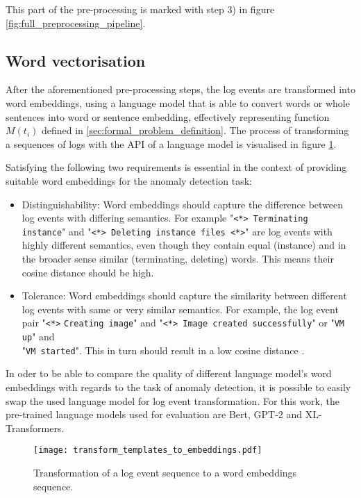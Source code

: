 This part of the pre-processing is marked with step 3) in figure \ref{fig:full_preprocessing_pipeline}.

\subsection{Word vectorisation \label{sec:word_vectorization}}
After the aforementioned pre-processing steps, the log events are transformed into word embeddings, using a language model that is able to convert words or whole sentences into word or sentence embedding, effectively representing function $M(t_i)$ defined in \ref{sec:formal_problem_definition}. The process of transforming a sequences of logs with the API of a language model is visualised in figure \ref{fig:transform_sequence_to_embeddings}.

Satisfying the following two requirements is essential in the context of providing suitable word embeddings for the anomaly detection task:
\begin{itemize}
	\item Distinguishability: Word embeddings should capture the difference between log events with differing semantics. For example "\verb!<*> Terminating instance!" and "\verb!<*> Deleting instance files <*>!" are log events with highly different semantics, even though they contain equal (instance) and in the broader sense similar (terminating, deleting) words. This means their cosine distance should be high.
	\item Tolerance: Word embeddings should capture the similarity between different log events with same or very similar semantics. For example, the log event pair "\verb!<*>! \verb!Creating image!" and "\verb!<*> Image created successfully!" or "\verb!VM up!" and \\ "\verb!VM started!". This in turn should result in a low cosine distance \cite{zhang2019robust}.
\end{itemize}

In oder to be able to compare the quality of different language model's word embeddings with regards to the task of anomaly detection, it is possible to easily swap the used language model for log event transformation. For this work, the pre-trained language models used for evaluation are Bert, GPT-2 and XL-Transformers. 


\begin{figure}[H]
	\centering
	\texttt{[image: transform\_templates\_to\_embeddings.pdf]}
	\caption{Transformation of a log event sequence to a word embeddings sequence.}
	\label{fig:transform_sequence_to_embeddings}
\end{figure}



